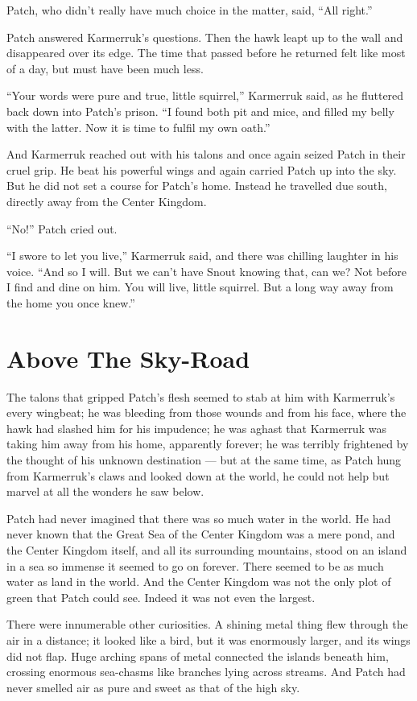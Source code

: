 \documentclass[12pt]{memoir}
\begin{document}
Patch, who didn’t really have much choice in the matter, said, “All
right.”

Patch answered Karmerruk’s questions. Then the hawk leapt up to the
wall and disappeared over its edge. The time that passed before he
returned felt like most of a day, but must have been much less.

“Your words were pure and true, little squirrel,” Karmerruk said, as
he fluttered back down into Patch’s prison. “I found both pit and
mice, and filled my belly with the latter. Now it is time to fulfil my
own oath.”

And Karmerruk reached out with his talons and once again seized Patch
in their cruel grip. He beat his powerful wings and again carried
Patch up into the sky. But he did not set a course for Patch’s
home. Instead he travelled due south, directly away from the Center
Kingdom.

“No!” Patch cried out.

“I swore to let you live,” Karmerruk said, and there was chilling
laughter in his voice. “And so I will. But we can’t have Snout knowing
that, can we? Not before I find and dine on him. You will live, little
squirrel. But a long way away from the home you once knew.”


\section{Above The Sky-Road}

The talons that gripped Patch’s flesh seemed to stab at him with
Karmerruk’s every wingbeat; he was bleeding from those wounds and from
his face, where the hawk had slashed him for his impudence; he was
aghast that Karmerruk was taking him away from his home, apparently
forever; he was terribly frightened by the thought of his unknown
destination — but at the same time, as Patch hung from Karmerruk’s
claws and looked down at the world, he could not help but marvel at
all the wonders he saw below.

Patch had never imagined that there was so much water in the world. He
had never known that the Great Sea of the Center Kingdom was a mere
pond, and the Center Kingdom itself, and all its surrounding
mountains, stood on an island in a sea so immense it seemed to go on
forever. There seemed to be as much water as land in the world. And
the Center Kingdom was not the only plot of green that Patch could
see. Indeed it was not even the largest.

There were innumerable other curiosities. A shining metal thing flew
through the air in a distance; it looked like a bird, but it was
enormously larger, and its wings did not flap. Huge arching spans of
metal connected the islands beneath him, crossing enormous sea-chasms
like branches lying across streams. And Patch had never smelled air as
pure and sweet as that of the high sky.
\end{document}
